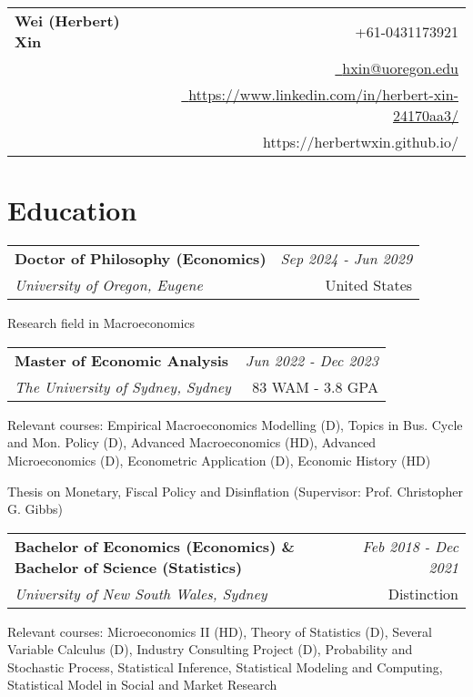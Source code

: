 \documentclass[a4paper,11pt]{article}
\makeatletter
\newcommand{\resumeSubheading}[4]{
\vspace{0.5mm}\item
    \begin{tabular*}{0.98\textwidth}[t]{l@{\extracolsep{\fill}}r}
        \textbf{#1} & \textit{\footnotesize{#4}} \\
        \textit{\footnotesize{#3}} &  \footnotesize{#2}\\
    \end{tabular*}
    \vspace{-2.4mm}
}
\newcommand{\resumeSubHeadingListStart}{\begin{list}{}{\leftmargin=0pt \itemindent=0pt}}
\newcommand{\resumeSubHeadingListEnd}{\end{list}\vspace{2mm}}
\newcommand{\name}{Wei (Herbert) Xin} %
\newcommand{\phone}{0431173921} %
\newcommand{\emaila}{hxin@uoregon.edu} %
\makeatother
\begin{document}
\selectfont

{
\begin{tabularx}{\linewidth}{L r} \\
  \textbf{\Large \name} & {\raisebox{0.0\height}{\footnotesize \faPhone}\ +61-\phone}\\
  {} & \href{mailto:\emaila}{\raisebox{0.0\height}{\footnotesize \faEnvelope}\ {\emaila}} \\
  & \href{www.linkedin.com/in/xxxx/}{\raisebox{0.0\height}{\footnotesize \faLinkedin}\ {https://www.linkedin.com/in/herbert-xin-24170aa3/}}\\
	& {https://herbertwxin.github.io/}

\end{tabularx}
}


\section{\textbf{Education}}
  \resumeSubHeadingListStart
    \resumeSubheading
    {Doctor of Philosophy (Economics)}{United States}
    {University of Oregon, Eugene}{Sep 2024 - Jun 2029}
    \item {Research field in Macroeconomics}
  \resumeSubHeadingListEnd

\vspace{-4.0mm}
  \resumeSubHeadingListStart
    \resumeSubheading
    {Master of Economic Analysis}{83 WAM - 3.8 GPA}
    {The University of Sydney, Sydney}{Jun 2022 - Dec 2023}
    \item {Relevant courses: Empirical Macroeconomics Modelling (D), Topics in Bus. Cycle and Mon. Policy (D), Advanced Macroeconomics (HD), Advanced Microeconomics (D), Econometric Application (D), Economic History (HD)}
    \vspace{-2.2mm} \item Thesis on Monetary, Fiscal Policy and Disinflation (Supervisor: Prof. Christopher G. Gibbs)
  \resumeSubHeadingListEnd

\vspace{-4.0mm}

  \resumeSubHeadingListStart
    \resumeSubheading
    {Bachelor of Economics (Economics) \& Bachelor of Science (Statistics)}{Distinction}
      {University of New South Wales, Sydney}{Feb 2018 - Dec 2021}
      \item {Relevant courses: Microeconomics II (HD), Theory of Statistics (D), Several Variable Calculus (D), Industry Consulting Project (D), Probability and Stochastic Process, Statistical Inference, Statistical Modeling and Computing, Statistical Model in Social and Market Research}
  \resumeSubHeadingListEnd
\end{document}

